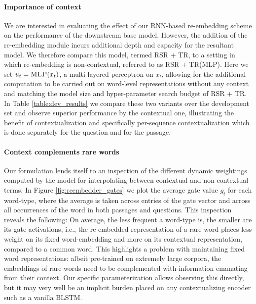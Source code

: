 \documentclass[11pt,a4paper]{article}
\newcommand{\bilstm}{\textsc{B\normalfont{i}LSTM}}
\newcommand{\rnn}{\textsc{RNN}}
\newcommand{\rasor}{\textsc{R\normalfont{a}S\normalfont{o}R}}
\newcommand{\tr}{\textsc{TR}}
\newcommand{\trMlp}{\textsc{TR(MLP)}}
\newcommand{\rasorTrLstm}{\rasor{} + \tr{}}
\newcommand{\rasorTrMlp}{\rasor{} + \trMlp{}}
\begin{document}
\paragraph{Importance of context}
We are interested in evaluating the effect of our \rnn{}-based re-embedding scheme on the performance of the downstream base model. However, the addition of the re-embedding module incurs additional depth and capacity for the resultant model. We therefore compare this model, termed \rasorTrLstm{}, to a setting in which re-embedding is non-contextual, referred to as \rasorTrMlp{}. Here we set $u_t=\textsc{MLP}(x_t)$, a multi-layered perceptron on $x_t$, allowing for the additional computation to be carried out on word-level representations without any context and matching the model size and hyper-parameter search budget of \rasorTrLstm{}.
In Table \ref{table:dev_results} we compare these two variants over the development set and observe superior performance by the contextual one, illustrating the benefit of contextualization and specifically per-sequence contextualization which is done separately for the question and for the passage.

\paragraph{Context complements rare words} Our formulation lends itself to an inspection of the different dynamic weightings computed by the model for interpolating between contextual and non-contextual terms. In Figure \ref{fig:reembedder_gates} we plot the average gate value $g_t$ for each word-type, where the average is taken across entries of the gate vector and across all occurrences of the word in both passages and questions. This inspection reveals the following:
On average, the less frequent a word-type is, the smaller are its gate activations, i.e., the re-embedded representation of a rare word places less weight on its fixed word-embedding and more on its contextual representation, compared to a common word. This  highlights a problem with maintaining fixed word representations: albeit pre-trained on extremely large corpora, the embeddings of rare words need to be complemented with information emanating from their context. Our specific parameterization allows observing this directly, but it may very well be an implicit burden placed on any contextualizing encoder such as a vanilla \bilstm.
\end{document}
